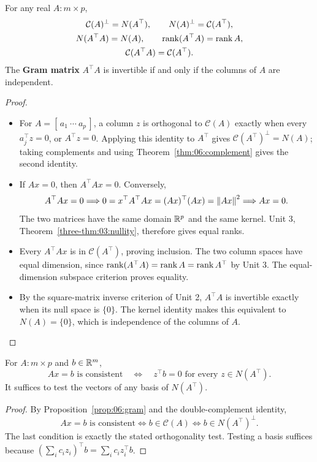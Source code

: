 \begin{proposition}\label{prop:06:gram}
For any real \(A:m\times p\),
\[
\begin{gathered}
\mathcal C(A)^\perp=N(A^\top),\qquad N(A)^\perp=\mathcal C(A^\top),\\
N(A^\top A)=N(A),\qquad \operatorname{rank}(A^\top A)=\operatorname{rank} A,\\
\mathcal C(A^\top A)=\mathcal C(A^\top).
\end{gathered}
\]
The \textbf{Gram matrix} \(A^\top A\) is invertible if and only if
the columns of \(A\) are independent.
\end{proposition}
\begin{proof}
\begin{itemize}
\item For \(A=[\,a_1\ \cdots\ a_p\,]\), a column \(z\) is orthogonal
  to \(\mathcal C(A)\) exactly when every \(a_j^\top z=0\), or \(A^\top z=0\).
  Applying this identity to \(A^\top\) gives
  \(\mathcal C(A^\top)^\perp=N(A)\); taking complements and using
  Theorem~\ref{thm:06:complement} gives the second identity.
\item If \(Ax=0\), then \(A^\top Ax=0\). Conversely,
  \[
  A^\top Ax=0\Longrightarrow
  0=x^\top A^\top Ax=(Ax)^\top(Ax)=\left\lVert Ax\right\rVert^2
  \Longrightarrow Ax=0.
  \]
  The two matrices have the same domain \(\mathbb R^p\) and the same kernel.
  Unit 3, Theorem~\ref{three-thm:03:nullity}, therefore gives equal ranks.
\item Every \(A^\top Ax\) is in \(\mathcal C(A^\top)\), proving inclusion.
  The two column spaces have equal dimension, since
  \(\operatorname{rank}(A^\top A)=\operatorname{rank} A=\operatorname{rank} A^\top\) by Unit 3.
  The equal-dimension subspace criterion proves equality.
\item By the square-matrix inverse criterion of Unit 2,
  \(A^\top A\) is invertible exactly when its null space is \(\{0\}\).
  The kernel identity makes this equivalent to \(N(A)=\{0\}\),
  which is independence of the columns of \(A\).
\end{itemize}
\end{proof}

\begin{proposition}\label{prop:06:compatibility}
For \(A:m\times p\) and \(b\in\mathbb R^m\),
\[
Ax=b\text{ is consistent}
\quad\Longleftrightarrow\quad
z^\top b=0\text{ for every }z\in N(A^\top).
\]
It suffices to test the vectors of any basis of \(N(A^\top)\).
\end{proposition}
\begin{proof}
By Proposition~\ref{prop:06:gram} and the double-complement identity,
\[
Ax=b\text{ is consistent}
\Longleftrightarrow b\in\mathcal C(A)
\Longleftrightarrow b\in N(A^\top)^\perp.
\]
The last condition is exactly the stated orthogonality test.
Testing a basis suffices because \((\sum_i c_i z_i)^\top b
=\sum_i c_i z_i^\top b\).
\end{proof}

